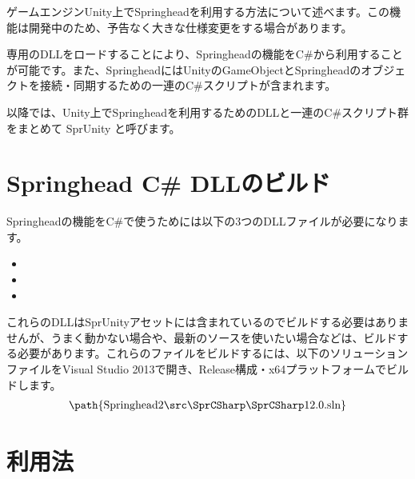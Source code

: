%
%
%

\begin{chapterabstract}
\KLUDGE ゲームエンジンUnity\KLUDGE 上でSpringhead\KLUDGE を利用する方法について述べます。この機能は開発中のため、予告なく大きな仕様変更をする場合があります。

\KLUDGE 専用のDLL\KLUDGE をロードすることにより、Springhead\KLUDGE の機能をC\#\KLUDGE から利用することが可能です。また、Springhead\KLUDGE にはUnity\KLUDGE のGameObject\KLUDGE とSpringhead\KLUDGE のオブジェクトを接続・同期するための一連のC\#\KLUDGE スクリプトが含まれます。

\KLUDGE 以降では、Unity\KLUDGE 上でSpringhead\KLUDGE を利用するためのDLL\KLUDGE と一連のC\#\KLUDGE スクリプト群をまとめて SprUnity \KLUDGE と呼びます。
\end{chapterabstract}

\section{Springhead C\# DLL\KLUDGE のビルド}

Springhead\KLUDGE の機能をC\#\KLUDGE で使うためには以下の3\KLUDGE つのDLL\KLUDGE ファイルが必要になります。
\begin{itemize}
\item {}
\item {}
\item {}
\end{itemize}

\KLUDGE これらのDLL\KLUDGE はSprUnity\KLUDGE アセットには含まれているのでビルドする必要はありませんが、うまく動かない場合や、最新のソースを使いたい場合などは、ビルドする必要があります。これらのファイルをビルドするには、以下のソリューションファイルをVisual Studio 2013\KLUDGE で開き、Release\KLUDGE 構成・x64\KLUDGE プラットフォームでビルドします。
\begin{align*}
\text{\path{Springhead2\src\SprCSharp\SprCSharp12.0.sln}}
\end{align*}


\section{\KLUDGE 利用法}

